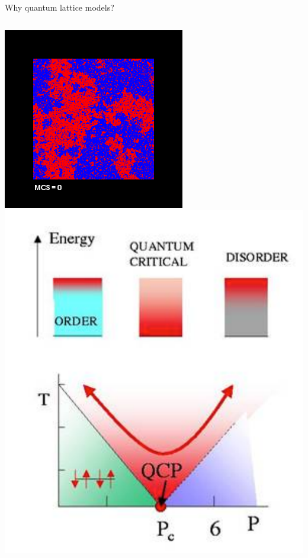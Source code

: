 \begin{frame}{Why quantum lattice models?}
  \begin{columns}[T]
    \begin{column}{.2\textwidth}
      \includegraphics[width=\textwidth]{ising-tc.png} \\
      \includegraphics[width=\textwidth]{qcp.pdf}

\end{column}
\end{columns}
\end{frame}
